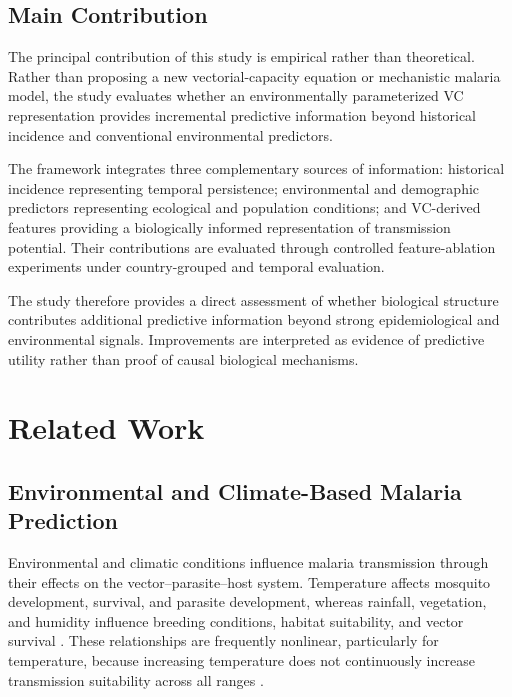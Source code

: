 \documentclass[10pt,twocolumn]{article}
\begin{document}
\subsection{Main Contribution}

The principal contribution of this study is empirical rather than
theoretical. Rather than proposing a new vectorial-capacity equation
or mechanistic malaria model, the study evaluates whether an
environmentally parameterized VC representation provides incremental
predictive information beyond historical incidence and conventional
environmental predictors.

The framework integrates three complementary sources of information:
historical incidence representing temporal persistence; environmental
and demographic predictors representing ecological and population
conditions; and VC-derived features providing a biologically informed
representation of transmission potential. Their contributions are
evaluated through controlled feature-ablation experiments under
country-grouped and temporal evaluation.

The study therefore provides a direct assessment of whether biological
structure contributes additional predictive information beyond strong
epidemiological and environmental signals. Improvements are interpreted
as evidence of predictive utility rather than proof of causal
biological mechanisms.





\section{Related Work}

\subsection{Environmental and Climate-Based Malaria Prediction}

Environmental and climatic conditions influence malaria transmission
through their effects on the vector--parasite--host system. Temperature
affects mosquito development, survival, and parasite development,
whereas rainfall, vegetation, and humidity influence breeding
conditions, habitat suitability, and vector survival
\parencite{LindsayBirley1996,MafweleLee2022,Dahlin2024}. These
relationships are frequently nonlinear, particularly for temperature,
because increasing temperature does not continuously increase
transmission suitability across all ranges
\parencite{Villena2022,Suh2024}.
\end{document}
